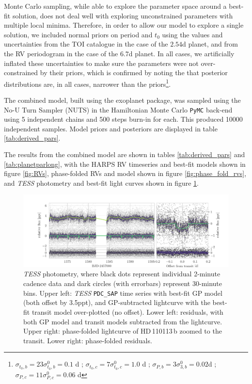\documentclass[fleqn,usenatbib]{mnras}
\newcommand{\tess}{{\it TESS}}
\newcommand{\harps}{{HARPS}}
\newcommand{\Tplanet}{HD\,110113\,b}
\begin{document}
Monte Carlo sampling, while able to explore the parameter space around a best-fit solution, does not deal well with exploring unconstrained parameters with multiple local minima. 
Therefore, in order to allow our model to explore a single solution, we included normal priors on period and $t_0$ using the values and uncertainties from the TOI catalogue in the case of the $2.54$d planet, and from the RV periodogram in the case of the $6.7$d planet.
In all cases, we artificially inflated these uncertainties to make sure the parameters were not over-constrained by their priors, which is confirmed by noting the that posterior distributions are, in all cases, narrower than the priors\footnote{$\sigma_{t_0,b} = 23\sigma^{0}_{t_0,b} = 0.1 $ d ; $\sigma_{t_0,c} = 7\sigma^{0}_{t_0,c} = 1.0$ d ; $\sigma_{P,b} = 3\sigma^{0}_{3,b} = 0.02 $d  ; $\sigma_{P,c} = 11\sigma^{0}_{P,c} = 0.06$ d}.

The combined model, built using the \textsf{exoplanet} \citep{exoplanet:exoplanet} package, was sampled using the No-U Turn Sampler (NUTS) in the Hamiltonian Monte Carlo \texttt{PyMC} back-end \citep{exoplanet:pymc3} using 5 independent chains and 500 steps burn-in for each.
This produced 10000 independent samples.
Model priors and posteriors are displayed in table \ref{tab:derived_pars}.

The results from the combined model are shown in tables \ref{tab:derived_pars} and \ref{tab:planetparlong}, with the \harps{} RV timeseries and best-fit models shown in figure \ref{fig:RVs}, phase-folded RVs and model shown in figure \ref{fig:phase_fold_rvs}, and \tess{} photometry and best-fit light curves shown in figure \ref{fig:photometry}.

\begin{figure}
	\includegraphics[width=\textwidth, trim={1.45cm 0.2 0.95cm 0.5}]{Combined_phot_plot_3_GPs_final.pdf}
    \caption{\tess{} photometry, where black dots represent individual 2-minute cadence data and dark circles (with errorbars) represent 30-minute bins. Upper left: \tess{} \texttt{PDC\_SAP} time series with best-fit GP model (both offset by 3.5ppt), and GP-subtracted lightcurve with the best-fit transit model over-plotted (no offset). Lower left: residuals, with both GP model and transit models subtracted from the lightcurve. Upper right: phase-folded lightcurve of \Tplanet{} zoomed to the transit. Lower right: phase-folded residuals. }
    \label{fig:photometry}
\end{figure}
\end{document}
